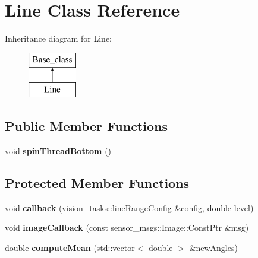 \hypertarget{classLine}{}\section{Line Class Reference}
\label{classLine}
Inheritance diagram for Line\+:\begin{figure}[H]
\begin{center}
\leavevmode
\includegraphics[height=2.000000cm]{classLine}
\end{center}
\end{figure}
\subsection*{Public Member Functions}
\begin{DoxyCompactItemize}
\item 
\mbox{\label{classLine_ae0baab0d7e417e7debb04ca7f1f3d0bd}} 
void {\bfseries spin\+Thread\+Bottom} ()
\end{DoxyCompactItemize}
\subsection*{Protected Member Functions}
\begin{DoxyCompactItemize}
\item 
\mbox{\label{classLine_adaec4c36ed87a85ef20dedae0dc64e3a}} 
void {\bfseries callback} (vision\+\_\+tasks\+::line\+Range\+Config \&config, double level)
\item 
\mbox{\label{classLine_a4fd089a81700282003dc3b4f3a9c6ac4}} 
void {\bfseries image\+Callback} (const sensor\+\_\+msgs\+::\+Image\+::\+Const\+Ptr \&msg)
\item 
\mbox{\label{classLine_a23aae96dede860bd33b5e57221701bfa}} 
double {\bfseries compute\+Mean} (std\+::vector$<$ double $>$ \&new\+Angles)
\end{DoxyCompactItemize}
